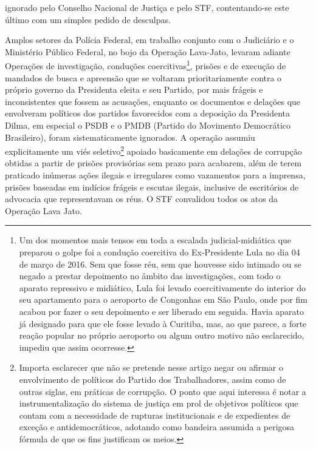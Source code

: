 ignorado pelo Conselho Nacional de Justiça e pelo STF, contentando-se
este último com um simples pedido de desculpas.

Amplos setores da Polícia Federal, em trabalho conjunto com o Judiciário
e o Ministério Público Federal, no bojo da Operação Lava-Jato, levaram
adiante Operações de investigação, conduções coercitivas\footnote{Um dos
  momentos mais tensos em toda a escalada judicial-midiática que
  preparou o golpe foi a condução coercitiva do Ex-Presidente Lula no
  dia 04 de março de 2016. Sem que fosse réu, sem que houvesse sido
  intimado ou se negado a prestar depoimento no âmbito das
  investigações, com todo o aparato repressivo e midiático, Lula foi
  levado coercitivamente do interior do seu apartamento para o aeroporto
  de Congonhas em São Paulo, onde por fim acabou por fazer o seu
  depoimento e ser liberado em seguida. Havia aparato já designado para
  que ele fosse levado à Curitiba, mas, ao que parece, a forte reação
  popular no próprio aeroporto ou algum outro motivo não esclarecido,
  impediu que assim ocorresse.}, prisões e de execução de mandados de
busca e apreensão que se voltaram prioritariamente contra o próprio
governo da Presidenta eleita e seu Partido, por mais frágeis e
inconsistentes que fossem as acusações, enquanto os documentos e
delações que envolveram políticos dos partidos favorecidos com a
deposição da Presidenta Dilma, em especial o PSDB e o PMDB (Partido do
Movimento Democrático Brasileiro), foram sistematicamente ignorados. A
operação assumiu explicitamente um viés seletivo\footnote{Importa
  esclarecer que não se pretende nesse artigo negar ou afirmar o
  envolvimento de políticos do Partido dos Trabalhadores, assim como de
  outras siglas, em práticas de corrupção. O ponto que aqui interessa é
  notar a instrumentalização do sistema de justiça em prol de objetivos
  políticos que contam com a necessidade de rupturas institucionais e de
  expedientes de exceção e antidemocráticos, adotando como bandeira
  assumida a perigosa fórmula de que os fins justificam os meios.}
apoiado basicamente em delações de corrupção obtidas a partir de prisões
provisórias sem prazo para acabarem, além de terem praticado inúmeras
ações ilegais e irregulares como vazamentos para a imprensa, prisões
baseadas em indícios frágeis e escutas ilegais, inclusive de escritórios
de advocacia que representavam os réus. O STF convalidou todos os atos
da Operação Lava Jato.

